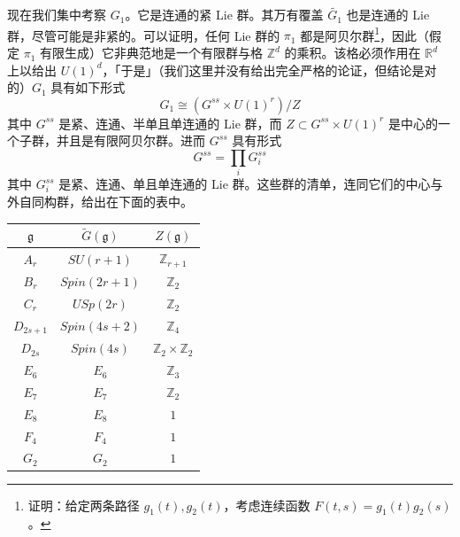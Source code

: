 现在我们集中考察 $G_1$。它是连通的紧 Lie 群。其万有覆盖 $\widetilde{G_1}$ 也是连通的 Lie 群，尽管可能是非紧的。可以证明，任何 Lie 群的 $\pi_1$ 都是阿贝尔群\footnote{证明：给定两条路径 $g_1(t),g_2(t)$，考虑连续函数 $F(t,s)=g_1(t)g_2(s)$。}，因此（假定 $\pi_1$ 有限生成）它非典范地是一个有限群与格 $\mathbb{Z}^d$ 的乘积。该格必须作用在 $\mathbb{R}^d$ 上以给出 $U(1)^d$，「于是」（我们这里并没有给出完全严格的论证，但结论是对的）$G_1$ 具有如下形式
\begin{equation}
G_1\cong(G^{ss}\times U(1)^r)/Z
\tag{J.2}
\label{eq:J.2}
\end{equation}
其中 $G^{ss}$ 是紧、连通、半单且单连通的 Lie 群，而 $Z\subset G^{ss}\times U(1)^r$ 是中心的一个子群，并且是有限阿贝尔群。进而 $G^{ss}$ 具有形式
\begin{equation}
G^{ss}=\prod_i G^{ss}_i
\tag{J.3}
\label{eq:J.3}
\end{equation}
其中 $G^{ss}_i$ 是紧、连通、单且单连通的 Lie 群。这些群的清单，连同它们的中心与外自同构群，给出在下面的表中。

\begin{center}
\begin{tabular}{|c|c|c|}
\hline
$\mathfrak{g}$ & $\widetilde{G}(\mathfrak{g})$ & $Z(\mathfrak{g})$\\
\hline
$A_r$ & $SU(r+1)$ & $\mathbb{Z}_{r+1}$\\
$B_r$ & $Spin(2r+1)$ & $\mathbb{Z}_2$\\
$C_r$ & $USp(2r)$ & $\mathbb{Z}_2$\\
$D_{2s+1}$ & $Spin(4s+2)$ & $\mathbb{Z}_4$\\
$D_{2s}$ & $Spin(4s)$ & $\mathbb{Z}_2\times\mathbb{Z}_2$\\
$E_6$ & $E_6$ & $\mathbb{Z}_3$\\
$E_7$ & $E_7$ & $\mathbb{Z}_2$\\
$E_8$ & $E_8$ & $1$\\
$F_4$ & $F_4$ & $1$\\
$G_2$ & $G_2$ & $1$\\
\hline
\end{tabular}
\end{center}


